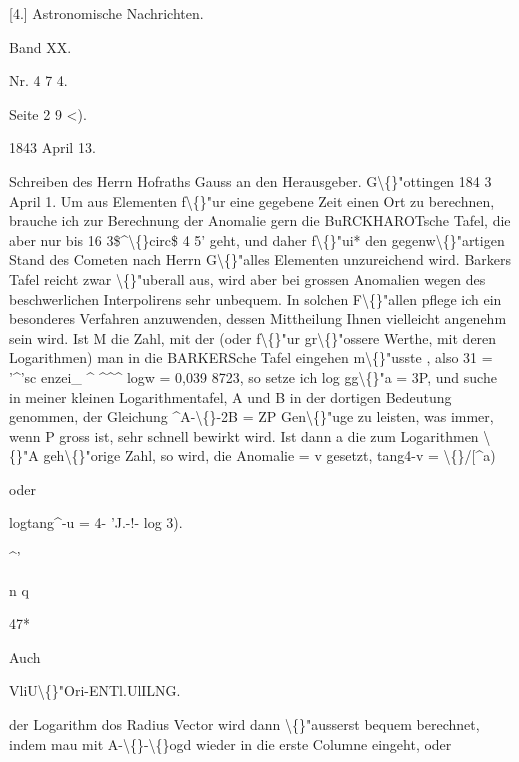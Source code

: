 \documentclass[10pt,a4paper]{article}
\begin{document}
[4.]
Astronomische Nachrichten.

Band XX.

Nr. 4 7 4.

Seite 2 9 <).

1843 April 13.

Schreiben des Herrn Hofraths Gauss an den Herausgeber.
G\textbackslash\{\}"ottingen 184 3 April 1.
Um aus Elementen f\textbackslash\{\}"ur eine gegebene Zeit einen Ort zu berechnen,
brauche ich zur Berechnung der Anomalie gern die BuRCKHAROTsche Tafel, die
aber nur bis 16 3\$\textasciicircum{}\textbackslash\{\}circ\$ 4 5' geht, und daher f\textbackslash\{\}"ui* den gegenw\textbackslash\{\}"artigen Stand des Cometen nach Herrn G\textbackslash\{\}"alles Elementen unzureichend wird. Barkers Tafel reicht
zwar \textbackslash\{\}"uberall aus, wird aber bei grossen Anomalien wegen des beschwerlichen
Interpolirens sehr unbequem. In solchen F\textbackslash\{\}"allen pflege ich ein besonderes
Verfahren anzuwenden, dessen Mittheilung Ihnen vielleicht angenehm sein wird.
Ist M die Zahl, mit der (oder f\textbackslash\{\}"ur gr\textbackslash\{\}"ossere Werthe, mit deren Logarithmen)
man in die BARKERSche
Tafel eingehen m\textbackslash\{\}"usste , also 31 = '\textasciicircum{}'sc enzei\_ \textasciicircum{} \textasciicircum{}\textasciicircum{}\textasciicircum{}
logw = 0,039 8723, so setze ich log gg\textbackslash\{\}"a = 3P, und suche in meiner kleinen
Logarithmentafel, A und B in der dortigen Bedeutung genommen, der Gleichung \textasciicircum{}A-\textbackslash\{\}-2B = ZP Gen\textbackslash\{\}"uge zu leisten, was immer, wenn P gross ist, sehr
schnell bewirkt wird. Ist dann a die zum Logarithmen \textbackslash\{\}"A geh\textbackslash\{\}"orige Zahl, so
wird, die Anomalie = v gesetzt,
tang4-v = \textbackslash\{\}/[\textasciicircum{}a)

oder

logtang\textasciicircum{}-u = 4- 'J.-!- log 3).

\textasciicircum{}'

n q

47*

\newpage

Auch

VliU\textbackslash\{\}"Ori-ENTl.UlILNG.

der Logarithm dos Radius Vector wird dann \textbackslash\{\}"ausserst bequem berechnet, indem mau mit A-\textbackslash\{\}-\textbackslash\{\}ogd wieder in die erste Columne eingeht, oder
\end{document}
